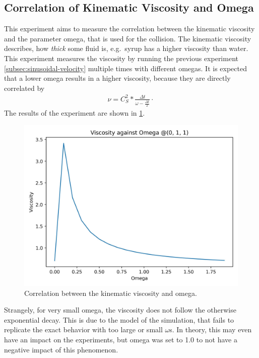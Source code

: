 \subsection{Correlation of Kinematic Viscosity and Omega}
This experiment aims to measure the correlation between the kinematic viscosity and the parameter omega, that is used for the collision.
The kinematic viscosity describes, how \textit{thick} some fluid is, e.g.\ syrup has a higher viscosity than water. %
This experiment measures the viscosity by running the previous experiment \cref{subsec:sinusoidal-velocity} multiple times with different omegas.
It is expected that a lower omega results in a higher viscosity, because they are directly correlated \cite{lecture} by
\begin{equation*}
    \begin{aligned}
        \nu = C^2_S * \frac{\Delta t}{ \omega - \frac{\Delta t}{2}} \cdot
    \end{aligned}
\end{equation*}
The results of the experiment are shown in \cref{fig:swd-vo-viscosity-vs-omega}.

\begin{figure}[H]
    \begin{center}
        \includegraphics[width=0.5\linewidth]{graphs/ShearWaveDecay/Viscosity/viscosity_against_omega}
        \caption{Correlation between the kinematic viscosity and omega.}
        \label{fig:swd-vo-viscosity-vs-omega}
    \end{center}
\end{figure}

Strangely, for very small omega, the viscosity does not follow the otherwise exponential decay.
This is due to the model of the simulation, that fails to replicate the exact behavior with too large or small $\omega$s. %
In theory, this may even have an impact on the experiments, but omega was set to 1.0 to not have a negative impact of this phenomenon.


